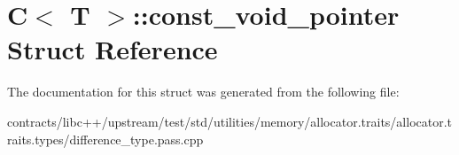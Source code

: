 \hypertarget{struct_c_1_1const__void__pointer}{}\section{C$<$ T $>$\+:\+:const\+\_\+void\+\_\+pointer Struct Reference}
\label{struct_c_1_1const__void__pointer}


The documentation for this struct was generated from the following file\+:\begin{DoxyCompactItemize}
\item 
contracts/libc++/upstream/test/std/utilities/memory/allocator.\+traits/allocator.\+traits.\+types/difference\+\_\+type.\+pass.\+cpp\end{DoxyCompactItemize}
